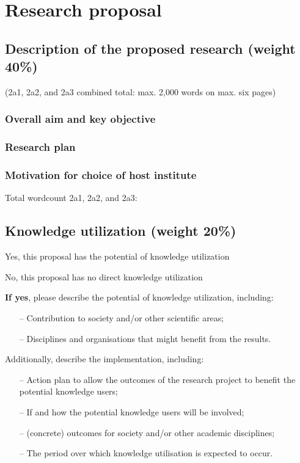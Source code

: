 \documentclass[10pt]{article}
\begin{document}
	\section{Research proposal}
	
	\subsection{Description of the proposed research (weight 40\%)}
	\vspace{-0.2cm}
	(2a1, 2a2, and 2a3 combined total: max. 2,000 words on max. six pages)
	
	\subsubsection{Overall aim and key objective}
	\subsubsection{Research plan}
	\subsubsection{Motivation for choice of host institute}
	
	
	Total wordcount 2a1, 2a2, and 2a3:  
	
	\subsection{Knowledge utilization (weight 20\%)}
	\begin{todolist}
		\setlength\itemsep{0em}
		\item Yes, this proposal has the potential of knowledge utilization
		\item No, this proposal has no direct knowledge utilization
	\end{todolist}
	
	\textbf{If yes}, please describe the potential of knowledge utilization, including: 
	\begin{itemize}
	    \item[--] Contribution to society and/or other scientific areas;
	    
	    \item[--] Disciplines and organisations that might benefit from the results.
 	\end{itemize}

    Additionally, describe the implementation, including:
    \begin{itemize}
	    \item[--] Action plan to allow the outcomes of the research project to benefit the potential knowledge users;
	    
	    \item[--] If and how the potential knowledge users will be involved;
	    
	    \item[--] (concrete) outcomes for society and/or other academic disciplines;
	    
	    \item[--] The period over which knowledge utilisation is expected to occur.
 	\end{itemize}
    
\end{document}
